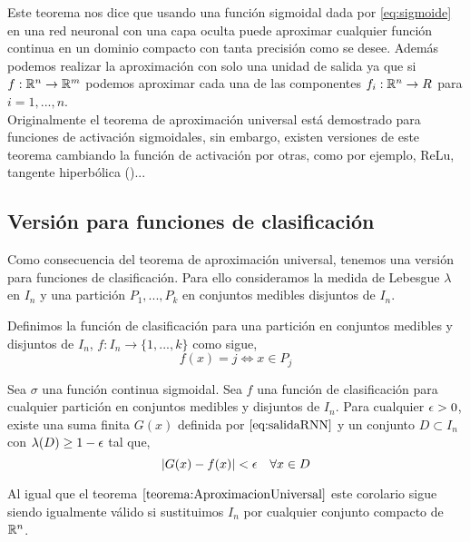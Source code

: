     Este teorema nos dice que usando una función sigmoidal dada por \eqref{eq:sigmoide} en una red neuronal con una capa oculta puede aproximar cualquier función continua en un dominio compacto con tanta precisión como se desee. Además podemos realizar la aproximación con solo una unidad de salida ya que si $f:\mathbb{R}^n \to \mathbb{R}^m$ podemos aproximar cada una de las componentes $f_i:\mathbb{R}^n \to R$ para $i=1,...,n$. \\
    
    
    Originalmente el teorema de aproximación universal está demostrado para funciones de activación sigmoidales, sin embargo, existen versiones de este teorema cambiando la función de activación por otras, como por ejemplo, ReLu, tangente hiperbólica (\cite{UML,lu2017expressive})...
    
\subsection{Versión para funciones de clasificación}

    Como consecuencia del teorema de aproximación universal, tenemos una versión para funciones de clasificación. Para ello consideramos la medida de Lebesgue $\lambda$ en $I_n$ y una partición $P_1,...,P_k$ en conjuntos medibles disjuntos de $I_n$.  
    
    \begin{definicion}
    Definimos la función de clasificación para una partición en conjuntos medibles y disjuntos de $I_n$, $f:I_n \to \{1,...,k\}$ como sigue,
    \begin{equation}
        f(x) = j \Leftrightarrow x \in P_j
    \end{equation}
    \end{definicion}
    
    \begin{corolario}
    Sea $\sigma$ una función continua sigmoidal. Sea $f$ una función de clasificación para cualquier partición en conjuntos medibles y disjuntos de $I_n$. Para cualquier $\epsilon > 0$, existe una suma finita $G(x)$ definida por $\eqref{eq:salidaRNN}$ y un conjunto $D \subset I_n$ con $\lambda(D) \geq 1 - \epsilon$ tal que,
    \begin{equation}
        |G(x) - f(x)| < \epsilon \quad \forall x \in D
    \end{equation}
    \end{corolario}
    
    Al igual que el teorema $\ref{teorema:AproximacionUniversal}$ este corolario sigue siendo igualmente válido si sustituimos $I_n$ por cualquier conjunto compacto de $\mathbb{R}^n$. \\  
    
    
    
\endinput